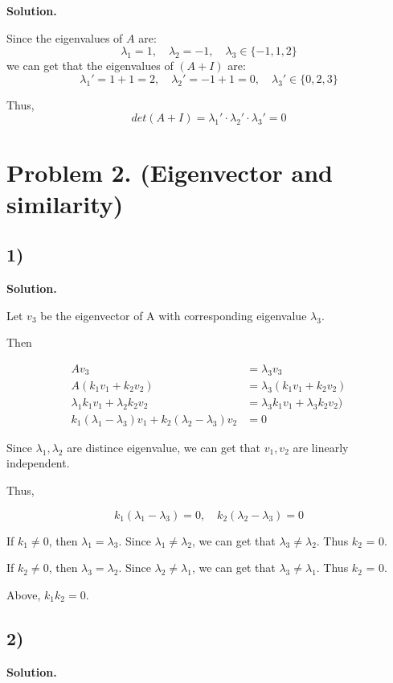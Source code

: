 \documentclass{article}
\newcommand{\0}{{\mathbf{0}}} %
\begin{document}
\textbf{Solution.}

Since the eigenvalues of $A$ are:
$$\lambda_1 = 1, \quad \lambda_2 = -1, \quad \lambda_3 \in \{-1, 1, 2\}$$
we can get that the eigenvalues of $(A + I)$ are:
$$\lambda_1' = 1 + 1=2, \quad \lambda_2' = -1 + 1 =0, \quad \lambda_3' \in \{0, 2, 3\}$$

Thus,
$$
det(A + I) = \lambda_1' \cdot \lambda_2' \cdot \lambda_3' = 0
$$

\section*{Problem 2. (Eigenvector and similarity)}

\subsection*{1)}

\textbf{Solution.}

Let $v_3$ be the eigenvector of A with corresponding eigenvalue $\lambda_3$.

Then

\begin{align*}
Av_3 &= \lambda_3 v_3   \\
A(k_1v_1 + k_2v_2)&=\lambda_3(k_1v_1+k_2v_2)    \\
\lambda_1k_1v_1 + \lambda_2k_2v_2&=\lambda_3k_1v_1+\lambda_3k_2v_2) \\
k_1(\lambda_1 - \lambda_3)v_1 + k_2(\lambda_2 - \lambda_3)v_2 &= 0
\end{align*}

Since $\lambda_1, \lambda_2$ are distince eigenvalue,
we can get that $v_1,v_2$ are linearly independent.

Thus,

$$
k_1(\lambda_1-\lambda_3) = 0, \quad k_2(\lambda_2 - \lambda_3) = 0
$$

If $k_1 \neq 0$, then $\lambda_1 = \lambda_3$.
Since $\lambda_1 \neq \lambda_2$,
we can get that $\lambda_3 \neq \lambda_2$.
Thus $k_2$ = 0.

If $k_2 \neq 0$, then $\lambda_3 = \lambda_2$.
Since $\lambda_2 \neq \lambda_1$,
we can get that $\lambda_3 \neq \lambda_1$.
Thus $k_2$ = 0.

Above, $k_1k_2 = 0$.

\subsection*{2)}

\textbf{Solution.}
\end{document}
